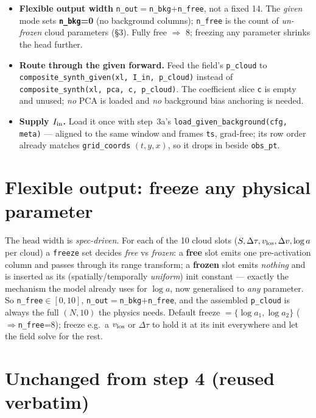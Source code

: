\documentclass[10pt,a4paper]{article}
\newcommand{\co}[1]{{\small\texttt{#1}}}
\begin{document}
\begin{itemize}
\item \textbf{Flexible output width} \co{n\_out}$=$\co{n\_bkg}$+$\co{n\_free}, not a fixed 14. The \emph{given} mode sets \textbf{\co{n\_bkg}=0} (no background columns); \co{n\_free} is the count of \emph{un-frozen} cloud parameters (\S3). Fully free $\Rightarrow$ 8; freezing any parameter shrinks the head further.
\item \textbf{Route through the given forward.} Feed the field's \co{p\_cloud} to \co{composite\_synth\_given(xl, I\_in, p\_cloud)} instead of \co{composite\_synth(xl, pca, c, p\_cloud)}. The coefficient slice \co{c} is empty and unused; \emph{no} PCA is loaded and \emph{no} background bias anchoring is needed.
\item \textbf{Supply $I_{\rm in}$.} Load it once with step~3a's \co{load\_given\_background(cfg, meta)} --- aligned to the same window and frames \co{ts}, grad-free; its row order already matches \co{grid\_coords} $(t,y,x)$, so it drops in beside \co{obs\_pt}.
\end{itemize}

\section{Flexible output: freeze any physical parameter}

The head width is \emph{spec-driven}. For each of the 10 cloud slots ($S,\Delta\tau,v_{\rm los},\Delta v,\log a$ per cloud) a \co{freeze} set decides \emph{free} vs \emph{frozen}: a \textbf{free} slot emits one pre-activation column and passes through its range transform; a \textbf{frozen} slot emits \emph{nothing} and is inserted as its (spatially/temporally \emph{uniform}) init constant --- exactly the mechanism the model already uses for $\log a$, now generalised to \emph{any} parameter. So \co{n\_free}$\in[0,10]$, \co{n\_out}$=$\co{n\_bkg}$+$\co{n\_free}, and the assembled \co{p\_cloud} is always the full $(N,10)$ the physics needs. Default freeze $=\{\log a_1,\log a_2\}$ ($\Rightarrow$\co{n\_free}=8); freeze e.g.\ a $v_{\rm los}$ or $\Delta\tau$ to hold it at its init everywhere and let the field solve for the rest.

\section{Unchanged from step 4 (reused verbatim)}
\end{document}

